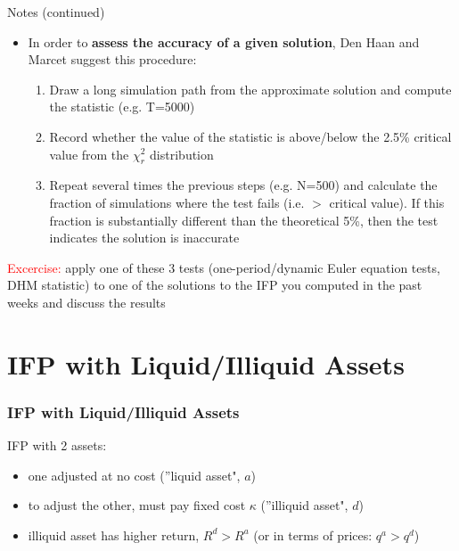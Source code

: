 \documentclass{beamer}
\begin{document}
\begin{frame}
  \begin{block}{Notes (continued)}
    \begin{itemize}
      \item In order to \textbf{assess the accuracy of a given solution}, Den Haan and Marcet suggest this procedure:
      \begin{enumerate}
        \item Draw a long simulation path from the approximate solution and compute the statistic (e.g. T=5000)
        \item Record whether the value of the statistic is above/below the 2.5\% critical value from the $\chi^2_r$ distribution
        \item Repeat several times the previous steps (e.g. N=500) and calculate the fraction of simulations where the test fails (i.e. $>$ critical value). If this fraction is substantially different than the theoretical 5\%, then the test indicates the solution is inaccurate
      \end{enumerate}
  \end{itemize}
  \end{block}
\bigskip

\textcolor{red}{Excercise:} apply one of these 3 tests (one-period/dynamic Euler equation tests, DHM statistic) to one of the solutions to the IFP you computed in the past weeks and discuss the results

\end{frame}

\section{IFP with Liquid/Illiquid Assets}


\begin{frame}
  \frametitle{IFP with Liquid/Illiquid Assets}
  IFP with 2 assets:
  \begin{itemize}
    \item one adjusted at no cost (''liquid asset", $a$)
    \item to adjust the other, must pay fixed cost $\kappa$ (''illiquid asset", $d$)
    \item illiquid asset has higher return, $R^d>R^a$ (or in terms of prices: $q^a>q^d$)
  \end{itemize}
\end{frame}
\end{document}
